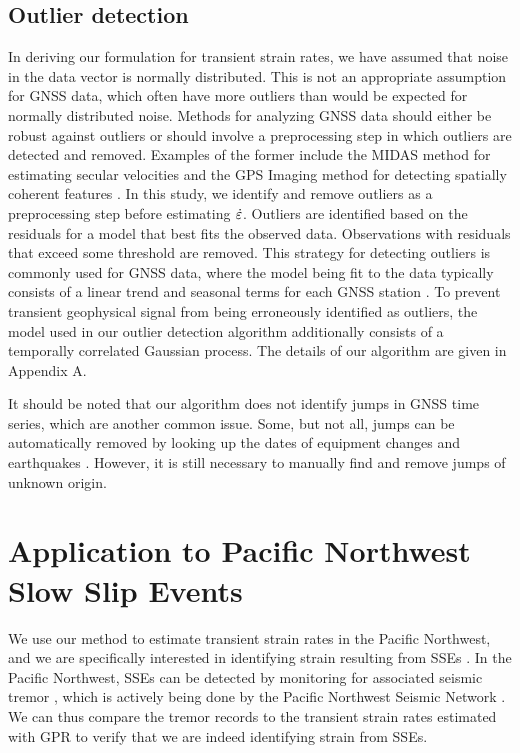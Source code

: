 \documentclass[extra,mreferee]{gji}
\begin{document}
\subsection{Outlier detection}\label{sec:Outlier}

In deriving our formulation for transient strain rates, we have
assumed that noise in the data vector is normally distributed. This is
not an appropriate assumption for GNSS data, which often have more
outliers than would be expected for normally distributed noise.
Methods for analyzing GNSS data should either be robust against
outliers or should involve a preprocessing step in which outliers are
detected and removed. Examples of the former include the MIDAS method
for estimating secular velocities \citep{Blewitt2016} and the GPS
Imaging method for detecting spatially coherent features
\citep{Hammond2016}. In this study, we identify and remove outliers as
a preprocessing step before estimating $\dot\varepsilon$. Outliers are
identified based on the residuals for a model that best fits the
observed data. Observations with residuals that exceed some threshold
are removed. This strategy for detecting outliers is commonly used for
GNSS data, where the model being fit to the data typically consists of
a linear trend and seasonal terms for each GNSS station
\citep[e.g.,][]{Johansson2002,Dong2006,Bos2013}. To prevent transient
geophysical signal from being erroneously identified as outliers, the
model used in our outlier detection algorithm additionally consists of
a temporally correlated Gaussian process. The details of our algorithm
are given in Appendix A.

It should be noted that our algorithm does not identify jumps in GNSS
time series, which are another common issue. Some, but not all, jumps
can be automatically removed by looking up the dates of equipment
changes and earthquakes \citep{Gazeaux2013}. However, it is still
necessary to manually find and remove jumps of unknown origin.


\section{Application to Pacific Northwest Slow Slip Events}\label{sec:Cascadia}

We use our method to estimate transient strain rates in the Pacific
Northwest, and we are specifically interested in identifying strain
resulting from SSEs \citep[e.g.,][]{Dragert2001}. In the Pacific
Northwest, SSEs can be detected by monitoring for associated seismic
tremor \citep{Rogers2003}, which is actively being done by the Pacific
Northwest Seismic Network \citep{Wech2010}. We can thus compare the
tremor records to the transient strain rates estimated with GPR to
verify that we are indeed identifying strain from SSEs.
\end{document}
